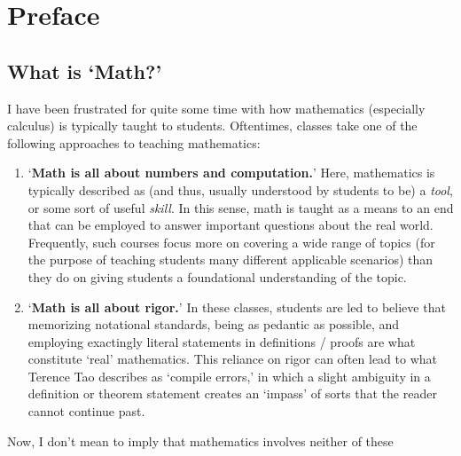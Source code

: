 \documentclass[10pt]{article}
\theoremstyle{definition}
\begin{document}
{\large%
\thispagestyle{empty}
\clearpage
\tableofcontents
\clearpage
\pagestyle{fancy}
\section{Preface}
\subsection{What is `Math?'}
I have been frustrated for quite some time with how mathematics
(especially calculus) is typically taught to students.  Oftentimes,
classes take one of the following approaches to teaching mathematics:
\begin{enumerate}
    \item `\textbf{Math is all about numbers and computation.}'  Here,
      mathematics is typically described as (and thus, usually
      understood by students to be) a \emph{tool}, or some sort of
      useful \emph{skill}.  In this sense, math is taught as a means
      to an end that can be employed to answer important questions
      about the real world.  Frequently, such courses focus more on
      covering a wide range of topics (for the purpose of teaching
      students many different applicable scenarios) than they do on
      giving students a foundational understanding of the topic.
    \item `\textbf{Math is all about rigor.}'  In these classes,
      students are led to believe that memorizing notational
      standards, being as pedantic as possible, and employing
      exactingly literal statements in definitions / proofs are what
      constitute `real' mathematics.  This reliance on rigor can often
      lead to what Terence Tao describes as `compile errors,' in which
      a slight ambiguity in a definition or theorem statement creates
      an `impass' of sorts that the reader cannot continue past.
\end{enumerate}
Now, I don't mean to imply that mathematics involves neither of these
}
\end{document}
